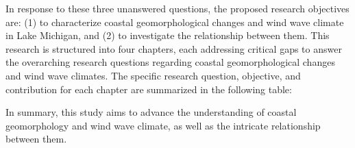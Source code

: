 In response to these three unanswered questions, the proposed research
objectives are: (1) to characterize coastal geomorphological changes and wind
wave climate in Lake Michigan, and (2) to investigate the relationship between
them. This research is structured into four chapters, each addressing critical
gaps to answer the overarching research questions regarding coastal
geomorphological changes and wind wave climates. The specific research question,
objective, and contribution for each chapter are summarized in the following
table:



In summary, this study aims to advance the understanding of coastal
geomorphology and wind wave climate, as well as the intricate relationship
between them.
